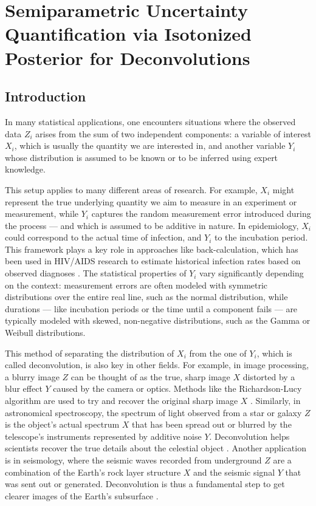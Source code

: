 
\graphicspath{{../Paper_VII/Paper_VII_latex/}}

\chapter[Deconvolution: semiparametric UQ via isotonized posterior]{\huge Semiparametric Uncertainty Quantification via Isotonized Posterior for Deconvolutions}

\section{Introduction}

In many statistical applications, one encounters situations where the observed data $Z_i$ arises from the sum of two independent components: a variable of interest $X_i$, which is usually the quantity we are interested in, and another variable $Y_i$ whose distribution is assumed to be known or to be inferred using expert knowledge. 

This setup applies to many different areas of research. For example, $X_i$ might represent the true underlying quantity we aim to measure in an experiment or measurement, while $Y_i$ captures the random measurement error introduced during the process --- and which is assumed to be additive in nature. In epidemiology, $X_i$ could correspond to the actual time of infection, and $Y_i$ to the incubation period. This framework plays a key role in approaches like back-calculation, which has been used in HIV/AIDS research to estimate historical infection rates based on observed diagnoses \cite{61}. The statistical properties of $Y_i$ vary significantly depending on the context: measurement errors are often modeled with symmetric distributions over the entire real line, such as the normal distribution, while durations --- like incubation periods or the time until a component fails --- are typically modeled with skewed, non-negative distributions, such as the Gamma or Weibull distributions.

This method of separating the distribution of $X_i$ from the one of $Y_i$, which is called deconvolution, is also key in other fields. For example, in image processing, a blurry image $Z$ can be thought of as the true, sharp image $X$ distorted by a blur effect $Y$ caused by the camera or optics. Methods like the Richardson-Lucy algorithm are used to try and recover the original sharp image $X$ \cite{68, 67}. Similarly, in astronomical spectroscopy, the spectrum of light observed from a star or galaxy $Z$ is the object's actual spectrum $X$ that has been spread out or blurred by the telescope's instruments represented by additive noise $Y$. Deconvolution helps scientists recover the true details about the celestial object \cite{107}. Another application is in seismology, where the seismic waves recorded from underground $Z$ are a combination of the Earth's rock layer structure $X$ and the seismic signal $Y$ that was sent out or generated. Deconvolution is thus a fundamental step to get clearer images of the Earth's subsurface \cite{109}.

